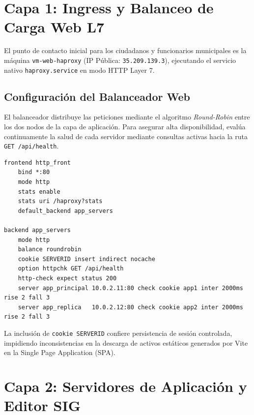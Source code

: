 \documentclass[12pt]{article}
\begin{document}

\section{Capa 1: Ingress y Balanceo de Carga Web L7}

El punto de contacto inicial para los ciudadanos y funcionarios municipales es la máquina \texttt{vm-web-haproxy} (IP Pública: \texttt{35.209.139.3}), ejecutando el servicio nativo \texttt{haproxy.service} en modo HTTP Layer 7.

\subsection{Configuración del Balanceador Web}
El balanceador distribuye las peticiones mediante el algoritmo \textit{Round-Robin} entre los dos nodos de la capa de aplicación. Para asegurar alta disponibilidad, evalúa continuamente la salud de cada servidor mediante consultas activas hacia la ruta \texttt{GET /api/health}.

\begin{lstlisting}[caption={Fragmento de configuración en /etc/haproxy/haproxy.cfg (VM 1).}]
frontend http_front
    bind *:80
    mode http
    stats enable
    stats uri /haproxy?stats
    default_backend app_servers

backend app_servers
    mode http
    balance roundrobin
    cookie SERVERID insert indirect nocache
    option httpchk GET /api/health
    http-check expect status 200
    server app_principal 10.0.2.11:80 check cookie app1 inter 2000ms rise 2 fall 3
    server app_replica   10.0.2.12:80 check cookie app2 inter 2000ms rise 2 fall 3
\end{lstlisting}

La inclusión de \texttt{cookie SERVERID} confiere persistencia de sesión controlada, impidiendo inconsistencias en la descarga de activos estáticos generados por Vite en la Single Page Application (SPA).


\section{Capa 2: Servidores de Aplicación y Editor SIG}
\end{document}
